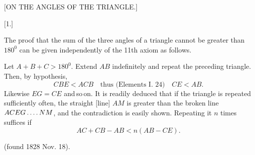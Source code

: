 \clearpage{}
\begin{center}
[ON THE ANGLES OF THE TRIANGLE.]
\end{center}

\begin{center}
[1.]
\end{center}

The proof that the sum of the three angles of a triangle cannot be greater
than $180^{0}$ can be given independently of the 11th axiom as follows.



\begin{center}

\end{center}

Let $A+B+C>180^{0}$. Extend $AB$ indefinitely and repeat the
preceding triangle. Then, by hypothesis,
\[
CBE < ACB \quad \text{thus (Elements I. 24)} \quad CE < AB.
\]
Likewise $EG=CE$ and\,so\,on. It is readily deduced that if the
triangle is repeated sufficiently often, the straight [line] $AM$ is greater
than the broken line $ACEG\mathinner{.\,.\,.\,.}NM$, and the contradiction is easily
shown. Repeating it $n$ times suffices if
\[AC+CB-AB < n(AB-CE).\]

(found 1828 Nov. 18).

